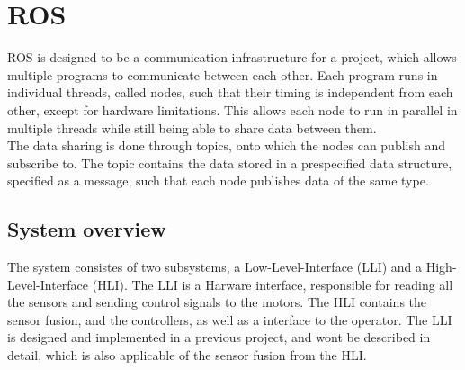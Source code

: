 \section{ROS}
ROS is designed to be a communication infrastructure for a project, which allows multiple programs to communicate between each other. 
Each program runs in individual threads, called nodes, such that their timing is independent from each other, except for hardware limitations.  
This allows each node to run in parallel in multiple threads while still being able to share data between them.\\
The data sharing is done through topics, onto which the nodes can publish and subscribe to. 
The topic contains the data stored in a prespecified data structure, specified as a message, such that each node publishes data of the same type. 
\subsection{System overview}
The system consistes of two subsystems, a Low-Level-Interface (LLI) and a High-Level-Interface (HLI). 
The LLI is a Harware interface, responsible for reading all the sensors and sending control signals to the motors.
The HLI contains the sensor fusion, and the controllers, as well as a interface to the operator. 
The LLI is designed and implemented in a previous project, and wont be described in detail, which is also applicable of the sensor fusion from the HLI.

